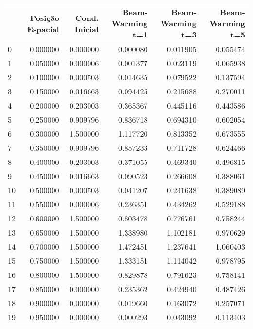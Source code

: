 \begin{tabular}{lrrrrr}
\toprule
 & Posição Espacial & Cond. Inicial & Beam-Warming t=1 & Beam-Warming t=3 & Beam-Warming t=5 \\
\midrule
0 & 0.000000 & 0.000000 & 0.000080 & 0.011905 & 0.055474 \\
1 & 0.050000 & 0.000006 & 0.001377 & 0.023119 & 0.065938 \\
2 & 0.100000 & 0.000503 & 0.014635 & 0.079522 & 0.137594 \\
3 & 0.150000 & 0.016663 & 0.094425 & 0.215688 & 0.270011 \\
4 & 0.200000 & 0.203003 & 0.365367 & 0.445116 & 0.443586 \\
5 & 0.250000 & 0.909796 & 0.836718 & 0.694310 & 0.602054 \\
6 & 0.300000 & 1.500000 & 1.117720 & 0.813352 & 0.673555 \\
7 & 0.350000 & 0.909796 & 0.857233 & 0.711728 & 0.624466 \\
8 & 0.400000 & 0.203003 & 0.371055 & 0.469340 & 0.496815 \\
9 & 0.450000 & 0.016663 & 0.090523 & 0.266608 & 0.388061 \\
10 & 0.500000 & 0.000503 & 0.041207 & 0.241638 & 0.389089 \\
11 & 0.550000 & 0.000006 & 0.236351 & 0.434262 & 0.529188 \\
12 & 0.600000 & 1.500000 & 0.803478 & 0.776761 & 0.758244 \\
13 & 0.650000 & 1.500000 & 1.338980 & 1.102181 & 0.970629 \\
14 & 0.700000 & 1.500000 & 1.472451 & 1.237641 & 1.060403 \\
15 & 0.750000 & 1.500000 & 1.333151 & 1.114042 & 0.978795 \\
16 & 0.800000 & 1.500000 & 0.829878 & 0.791623 & 0.758141 \\
17 & 0.850000 & 0.000000 & 0.235362 & 0.424940 & 0.487426 \\
18 & 0.900000 & 0.000000 & 0.019660 & 0.163072 & 0.257071 \\
19 & 0.950000 & 0.000000 & 0.000293 & 0.043092 & 0.113403 \\
\bottomrule
\end{tabular}
